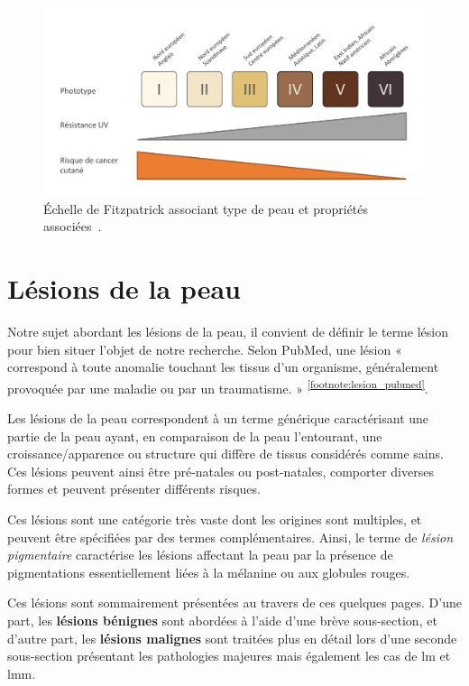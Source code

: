 \begin{figure}[H]
    \centering
    \includegraphics[width=0.8\linewidth]{contents/chapter_1/resources/scheme_fitzpatrick_scale.pdf}
    \caption{Échelle de Fitzpatrick associant type de peau et propriétés associées~\cite{Fitzpatrick1988}.}
    \label{fig:scheme_fitzpatrick_scale}
\end{figure}


\section{Lésions de la peau}
Notre sujet abordant les lésions de la peau, il convient de définir le terme lésion pour bien situer l’objet de notre recherche. Selon PubMed, une lésion « correspond à toute anomalie touchant les tissus d’un organisme, généralement provoquée par une maladie ou par un traumatisme. » \textsuperscript{\ref{footnote:lesion_pubmed}}.\par
\addtocounter{footnote}{1}

Les lésions de la peau correspondent à un terme générique caractérisant une partie de la peau ayant, en comparaison de la peau l’entourant, une croissance/apparence ou structure qui diffère de tissus considérés comme sains. Ces lésions peuvent ainsi être pré-natales ou post-natales, comporter diverses formes et peuvent présenter différents risques.\par

Ces lésions sont une catégorie très vaste dont les origines sont multiples, et peuvent être spécifiées par des termes complémentaires. Ainsi, le terme de \textit{lésion pigmentaire} caractérise les lésions affectant la peau par la présence de pigmentations essentiellement liées à la mélanine ou aux globules rouges.\par

Ces lésions sont sommairement présentées au travers de ces quelques pages. D'une part, les \textbf{lésions bénignes} sont abordées à l'aide d'une brève sous-section, et d'autre part, les \textbf{lésions malignes} sont traitées plus en détail lors d'une seconde sous-section présentant les pathologies majeures mais également les cas de \acrlong{lm} et \acrlong{lmm}.\par

